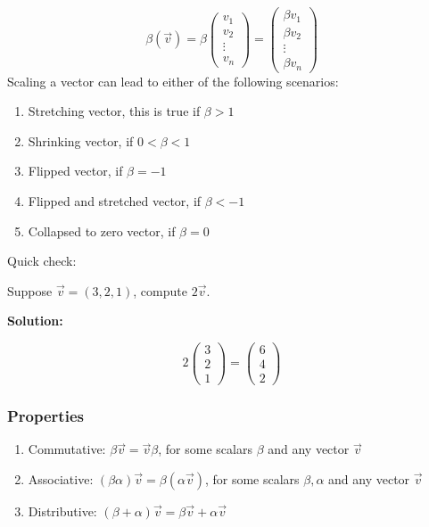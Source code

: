\documentclass[11pt]{article}
\begin{document}
\[
\beta(\vec v) = \beta \begin{pmatrix}
v_1\\
v_2\\
\vdots \\
v_n
\end{pmatrix}
=
\begin{pmatrix}
\beta v_1\\
\beta v_2\\
\vdots\\
\beta v_n
\end{pmatrix}
\]
Scaling a vector can lead to either of the following scenarios:
\begin{enumerate}
\item Stretching vector, this is true if $\beta > 1$
\item Shrinking vector, if $0 < \beta < 1$
\item Flipped vector, if $\beta = -1$
\item Flipped and stretched vector, if $\beta < -1$
\item Collapsed to zero vector, if $\beta = 0$
\end{enumerate}
Quick check:

Suppose $\vec v = (3, 2, 1)$, compute $2\vec v$.

\vspace{0.15in}

\begin{center}
\textbf{Solution: }
\end{center}
\[
2\begin{pmatrix}
3\\2\\1
\end{pmatrix}
= \begin{pmatrix}
6\\4\\2
\end{pmatrix}
\]

\subsubsection*{Properties}
\begin{enumerate}
\item Commutative: $\beta \vec v = \vec v \beta$, for some scalars $\beta$ and any vector $\vec v$
\item Associative: $(\beta \alpha)\vec v = \beta (\alpha \vec v)$, for some scalars $\beta, \alpha$ and any vector $\vec v$
\item Distributive: $(\beta + \alpha) \vec v = \beta \vec v + \alpha \vec v$
\end{enumerate}
\end{document}
